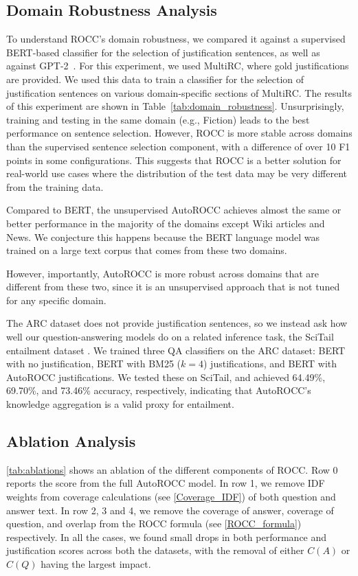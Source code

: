 \subsection{Domain Robustness Analysis}
\label{domain_robustness}

To understand ROCC's domain robustness, we compared it against a supervised BERT-based classifier for the selection of justification sentences, as well as against GPT-2~\cite{wang2019evidence}. For this experiment, we used MultiRC, where gold justifications are provided. We used this data to train a classifier for the selection of justification sentences on various domain-specific sections of MultiRC. The results of this experiment are shown in Table~\ref{tab:domain_robustness}. Unsurprisingly, training and testing in the same domain (e.g., Fiction) leads to the best performance on sentence selection. However, ROCC is more stable across domains than the supervised sentence selection component, with a difference of over 10 F1 points in some configurations. This suggests that ROCC is a better solution for real-world use cases where the distribution of the test data may be very different from the training data.  

Compared to BERT, the unsupervised AutoROCC achieves almost the same or better performance in the majority of the domains except Wiki articles and News. We conjecture this happens because the BERT language model was trained on a large text corpus that comes from these two domains. 

However, importantly, AutoROCC is more robust across domains that are different from these two, since it is an unsupervised approach that is not tuned for any specific domain. 

The ARC dataset does not provide justification sentences, so we instead ask how well our question-answering models do on a related inference task, the SciTail entailment dataset \cite{khot2018scitail}. We trained three QA classifiers on the ARC dataset: BERT with no justification, BERT with BM25 ($k=4$) justifications, and BERT with AutoROCC justifications. We tested these on SciTail, and achieved 64.49\%, 69.70\%, and 73.46\% accuracy, respectively, indicating that AutoROCC's knowledge aggregation is a valid proxy for entailment.

\subsection{Ablation Analysis}

\ref{tab:ablations} shows an ablation of the different components of ROCC. Row 0 reports the score from the full AutoROCC model. In row 1, we remove IDF weights from coverage calculations (see \ref{Coverage_IDF}) of both question and answer text. In row 2, 3 and 4, we remove the coverage of answer, coverage of question, and overlap from the ROCC formula (see \ref{ROCC_formula}) respectively. In all the cases, we found small drops in both performance and justification scores across both the datasets, with the removal of either $C(A)$ or $C(Q)$ having the largest impact.

